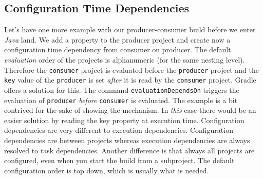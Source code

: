 \subsection{Configuration Time Dependencies} %
\label{sub:configuration_time_dependencies}
Let's have one more example with our producer-consumer build before we enter \emph{Java} land. We add a property to the producer project and create now a configuration time dependency from consumer on producer. 
The default \emph{evaluation} order of the projects is alphanumeric (for the same nesting level). Therefore the \texttt{consumer} project is evaluated before the \texttt{producer} project and the \texttt{key} value of the \texttt{producer} is set \emph{after} it is read by the \texttt{consumer} project. Gradle offers a solution for this. 
The command \texttt{evaluationDependsOn} triggers the evaluation of \texttt{producer} \emph{before} \texttt{consumer} is evaluated.
The example is a bit contrived for the sake of showing the mechanism. In \emph{this} case there would be an easier solution by reading the key property at execution time.
Configuration dependencies are very different to execution dependencies. Configuration dependencies are between projects whereas execution dependencies are always resolved to task dependencies. Another difference is that always all projects are configured, even when you start the build from a subproject. The default configuration order is top down, which is usually what is needed. 

